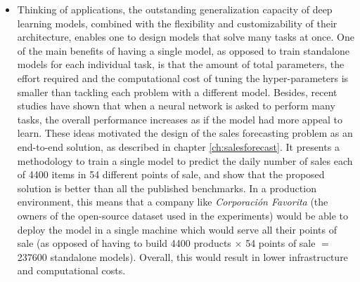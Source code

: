 \begin{itemize}
\item Thinking of applications, the outstanding generalization capacity of deep learning models, combined with the flexibility and customizability of their architecture, enables one to design models that solve many tasks at once. One of the main benefits of having a single model, as opposed to train standalone models for each individual task, is that the amount of total parameters, the effort required and the computational cost of tuning the hyper-parameters is smaller than tackling each problem with a different model. Besides, recent studies have shown that when a neural network is asked to perform many tasks, the overall performance increases \autocite{Jaderberg2016} as if the model had more appeal to learn. These ideas motivated the design of the sales forecasting problem as an end-to-end solution, as described in chapter \ref{ch:salesforecast}. It presents a methodology to train a single model to predict the daily number of sales each of 4400 items in 54 different points of sale, and show that the proposed solution is better than all the published benchmarks. In a production environment, this means that a company like \textit{Corporación Favorita} (the owners of the open-source dataset used in the experiments) would be able to deploy the model in a single machine which would serve all their points of sale (as opposed of having to build 4400 products $\times$ 54 points of sale $=$ 237600 standalone models). Overall, this would result in lower infrastructure and computational costs.


\end{itemize}
